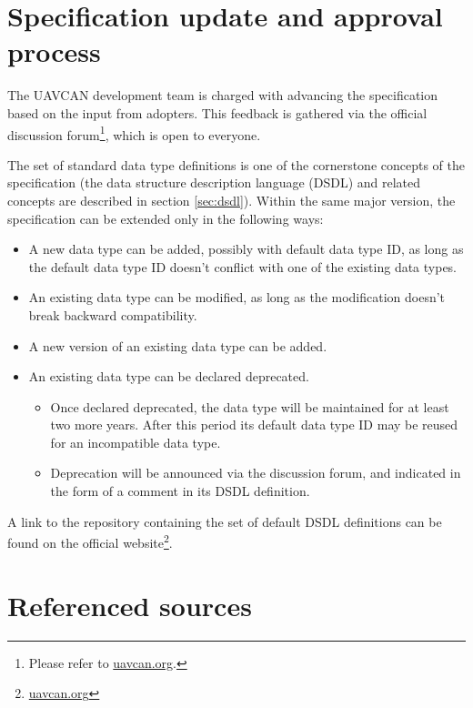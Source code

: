 \section{Specification update and approval process}

The UAVCAN development team is charged with advancing the specification based on the input from adopters.
This feedback is gathered via the official discussion
forum\footnote{Please refer to \href{http://uavcan.org}{uavcan.org}.},
which is open to everyone.

The set of standard data type definitions is one of the cornerstone concepts of the specification
(the data structure description language (DSDL) and related concepts are described in section \ref{sec:dsdl}).
Within the same major version, the specification can be extended only in the following ways:

\begin{itemize}
    \item A new data type can be added, possibly with default data type ID,
    as long as the default data type ID doesn't conflict with one of the existing data types.

    \item An existing data type can be modified, as long as the modification doesn't break backward compatibility.

    \item A new version of an existing data type can be added.

    \item An existing data type can be declared deprecated.
    \begin{itemize}
        \item Once declared deprecated, the data type will be maintained for at least two more years.
        After this period its default data type ID may be reused for an incompatible data type.

        \item Deprecation will be announced via the discussion forum, and indicated in the form of a comment
        in its DSDL definition.
    \end{itemize}
\end{itemize}

A link to the repository containing the set of default DSDL definitions can be found on the official
website\footnote{\href{http://uavcan.org}{uavcan.org}}.

\section{Referenced sources}

